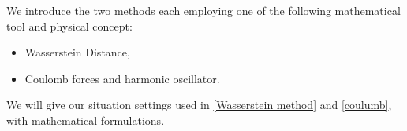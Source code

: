 \documentclass{article}
\numberwithin{equation}{section}
\theoremstyle{definition}
\begin{document}
We introduce the two methods each employing one of the following mathematical tool and physical concept:
\begin{itemize}
    \item Wasserstein Distance,\vspace{-2mm}
    \item Coulomb forces and harmonic oscillator.
\end{itemize}




We will give our situation settings used in \autoref{Wasserstein method} and \autoref{coulumb}, with mathematical formulations.

\end{document}
